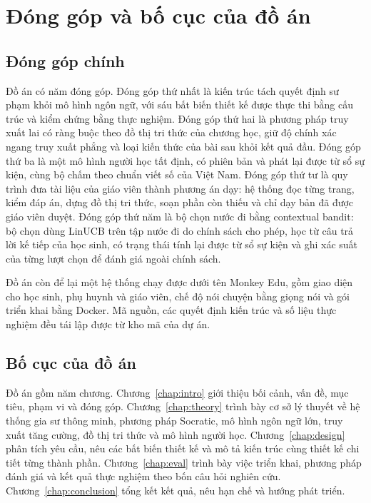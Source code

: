 \section{Đóng góp và bố cục của đồ án}

\subsection{Đóng góp chính}
Đồ án có năm đóng góp. Đóng góp thứ nhất là kiến trúc tách quyết định sư phạm khỏi mô hình ngôn ngữ, với sáu bất biến thiết kế được thực thi bằng cấu trúc và kiểm chứng bằng thực nghiệm. Đóng góp thứ hai là phương pháp truy xuất lai có ràng buộc theo đồ thị tri thức của chương học, giữ độ chính xác ngang truy xuất phẳng và loại kiến thức của bài sau khỏi kết quả đầu. Đóng góp thứ ba là một mô hình người học tất định, có phiên bản và phát lại được từ sổ sự kiện, cùng bộ chấm theo chuẩn viết số của Việt Nam. Đóng góp thứ tư là quy trình đưa tài liệu của giáo viên thành phương án dạy: hệ thống đọc từng trang, kiểm đáp án, dựng đồ thị tri thức, soạn phần còn thiếu và chỉ dạy bản đã được giáo viên duyệt. Đóng góp thứ năm là bộ chọn nước đi bằng contextual bandit: bộ chọn dùng LinUCB trên tập nước đi do chính sách cho phép, học từ câu trả lời kế tiếp của học sinh, có trạng thái tính lại được từ sổ sự kiện và ghi xác suất của từng lượt chọn để đánh giá ngoài chính sách.

Đồ án còn để lại một hệ thống chạy được dưới tên Monkey Edu, gồm giao diện cho học sinh, phụ huynh và giáo viên, chế độ nói chuyện bằng giọng nói và gói triển khai bằng Docker. Mã nguồn, các quyết định kiến trúc và số liệu thực nghiệm đều tái lập được từ kho mã của dự án.

\subsection{Bố cục của đồ án}
Đồ án gồm năm chương. Chương~\ref{chap:intro} giới thiệu bối cảnh, vấn đề, mục tiêu, phạm vi và đóng góp. Chương~\ref{chap:theory} trình bày cơ sở lý thuyết về hệ thống gia sư thông minh, phương pháp Socratic, mô hình ngôn ngữ lớn, truy xuất tăng cường, đồ thị tri thức và mô hình người học. Chương~\ref{chap:design} phân tích yêu cầu, nêu các bất biến thiết kế và mô tả kiến trúc cùng thiết kế chi tiết từng thành phần. Chương~\ref{chap:eval} trình bày việc triển khai, phương pháp đánh giá và kết quả thực nghiệm theo bốn câu hỏi nghiên cứu. Chương~\ref{chap:conclusion} tổng kết kết quả, nêu hạn chế và hướng phát triển.
